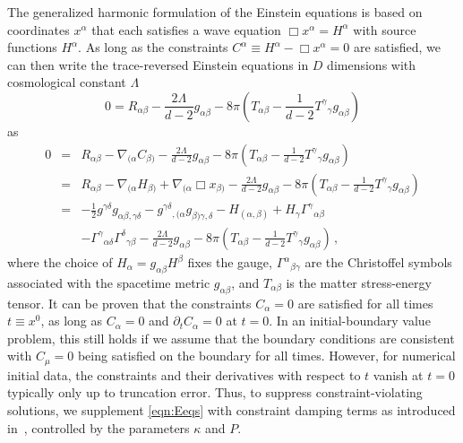 \documentclass[a4paper,11pt]{article}
\numberwithin{equation}{section}
\begin{document}
The generalized harmonic formulation of the Einstein equations is based on coordinates $x^\alpha$ that each satisfies a wave equation $\Box x^{\alpha}=H^\alpha$ with source functions $H^\alpha$.
As long as the constraints $C^\alpha \equiv H^\alpha-\Box x^\alpha=0$ are satisfied,
we can then write the trace-reversed Einstein equations in $D$ dimensions with cosmological constant $\Lambda$
\begin{equation}
0=R_{\alpha\beta} - \frac{2\Lambda}{d-2} g_{\alpha\beta} - 8\pi\left( T_{\alpha\beta} - \frac{1}{d-2} {T^\gamma}_\gamma g_{\alpha\beta} \right)
\end{equation}
as
\begin{eqnarray}
0
&=& R_{\alpha\beta} - \nabla_{(\alpha} C_{\beta)} - \frac{2\Lambda}{d-2} g_{\alpha\beta} - 8\pi\left( T_{\alpha\beta} - \frac{1}{d-2} {T^\gamma}_\gamma g_{\alpha\beta} \right) \nonumber \\
&=& R_{\alpha\beta} - \nabla_{(\alpha} H_{\beta)} + \nabla_{(\alpha} \Box{x}_{\beta)} - \frac{2\Lambda}{d-2} g_{\alpha\beta} - 8\pi\left( T_{\alpha\beta} - \frac{1}{d-2} {T^\gamma}_\gamma g_{\alpha\beta} \right) \nonumber \\
&=& -\frac{1}{2} g^{\gamma\delta} g_{\alpha\beta,\gamma\delta} - g^{\gamma\delta}{}_{,(\alpha}g_{\beta)\gamma,\delta} - H_{(\alpha,\beta)} + H_\gamma \Gamma^\gamma{}_{\alpha\beta} \nonumber \\
&&- \Gamma^\gamma{}_{\alpha\delta}\Gamma^\delta{}_{\gamma\beta} - \frac{2\Lambda}{d-2} g_{\alpha\beta} - 8\pi\left( T_{\alpha\beta} - \frac{1}{d-2} {T^\gamma}_\gamma g_{\alpha\beta}\right) \,, \label{eqn:Eeqs} 
\end{eqnarray}
where the choice of $H_\alpha = g_{\alpha\beta} H^\beta$ fixes the gauge, $\Gamma^\alpha{}_{\beta\gamma}$ are the Christoffel symbols associated with
the spacetime metric $g_{\alpha\beta}$, and $T_{\alpha\beta}$ is the matter stress-energy tensor. 
It can be proven that the constraints $C_\alpha=0$ are satisfied for all times $t\equiv x^0$, as long as $C_\alpha=0$ and $\partial_{t}C_\alpha=0$ at $t=0$. In an initial-boundary value problem, this still holds if we assume that the boundary conditions are consistent with $C_\mu=0$ being satisfied on the boundary for all times.
However, for numerical initial data, the constraints and their derivatives with respect to $t$ vanish at $t=0$ typically only up to truncation error. Thus, to suppress constraint-violating solutions, we supplement \eqref{eqn:Eeqs} with constraint damping terms as introduced in~\cite{Gundlach:2005eh}, controlled by the parameters $\kappa$ and $P$.
\end{document}
